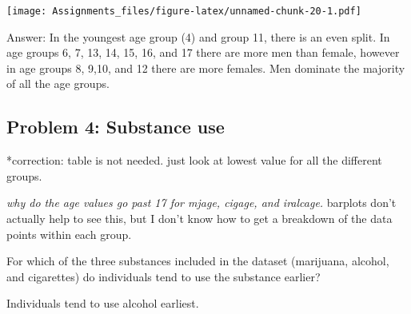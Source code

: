 \documentclass[
]{article}
\newenvironment{Shaded}{\begin{snugshade}}{\end{snugshade}}
\newcommand{\AttributeTok}[1]{\textcolor[rgb]{0.77,0.63,0.00}{#1}}
\newcommand{\CommentTok}[1]{\textcolor[rgb]{0.56,0.35,0.01}{\textit{#1}}}
\newcommand{\ConstantTok}[1]{\textcolor[rgb]{0.00,0.00,0.00}{#1}}
\newcommand{\FunctionTok}[1]{\textcolor[rgb]{0.00,0.00,0.00}{#1}}
\newcommand{\NormalTok}[1]{#1}
\newcommand{\OtherTok}[1]{\textcolor[rgb]{0.56,0.35,0.01}{#1}}
\newcommand{\SpecialCharTok}[1]{\textcolor[rgb]{0.00,0.00,0.00}{#1}}
\newcommand{\StringTok}[1]{\textcolor[rgb]{0.31,0.60,0.02}{#1}}
\begin{document}
\begin{Shaded}
\end{Shaded}

\texttt{[image: Assignments\_files/figure-latex/unnamed-chunk-20-1.pdf]}

Answer: In the youngest age group (4) and group 11, there is an even
split. In age groups 6, 7, 13, 14, 15, 16, and 17 there are more men
than female, however in age groups 8, 9,10, and 12 there are more
females. Men dominate the majority of all the age groups.

\hypertarget{problem-4-substance-use}{%
\subsection{Problem 4: Substance use}\label{problem-4-substance-use}}

*correction: table is not needed. just look at lowest value for all the
different groups.

\emph{why do the age values go past 17 for mjage, cigage, and iralcage.
}barplots don't actually help to see this, but I don't know how to get a
breakdown of the data points within each group.

For which of the three substances included in the dataset (marijuana,
alcohol, and cigarettes) do individuals tend to use the substance
earlier?

Individuals tend to use alcohol earliest.

\begin{Shaded}
\end{Shaded}
\end{document}
